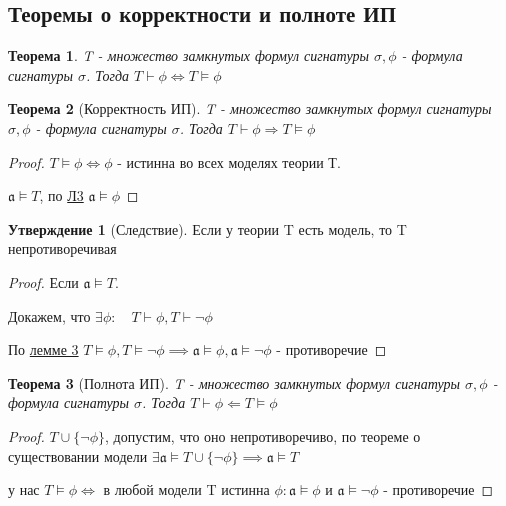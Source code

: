 \documentclass[a4paper]{article}
\newtheorem{theorem}{Теорема}[section]
\theoremstyle{definition}
\newtheorem*{statement}{Утверждение}
\theoremstyle{remark}
\begin{document}
    \subsection{Теоремы о корректности и полноте ИП}
	\begin{theorem}
        T - множество замкнутых формул сигнатуры $\sigma, \phi$ - формула сигнатуры $\sigma$. Тогда  
		$T \vdash \phi \Leftrightarrow T \models \phi$ 
	\end{theorem}
    \begin{theorem}[Корректность ИП]
        T - множество замкнутых формул сигнатуры $\sigma, \phi$ - формула сигнатуры $\sigma$. Тогда  
		$T \vdash \phi \Rightarrow T \models \phi$ 
	\end{theorem}
    \begin{proof}
        $T\models \phi \Leftrightarrow\phi$ - истинна во всех моделях теории Т.

        $\mathfrak{a}\models T$, по \hyperlink{Лемма 3}{Л3} $\mathfrak{a}\models \phi$
    \end{proof}
    \begin{statement}[Следствие]
        Если у теории T есть модель, то T непротиворечивая
    \end{statement}
    \begin{proof}
        Если $\mathfrak{a}\models T.$

        Докажем, что $\exists \phi: \quad T\vdash \phi, T\vdash \neg \phi$
        
        По \hyperlink{Лемма 3}{лемме 3}
        $T\models \phi, T\models \neg\phi\implies \mathfrak{a}\models \phi, \mathfrak{a}\models \neg\phi$ - противоречие
    \end{proof}
    \begin{theorem}[Полнота ИП]
        T - множество замкнутых формул сигнатуры $\sigma, \phi$ - формула сигнатуры $\sigma$. Тогда  
		$T \vdash \phi \Leftarrow T \models \phi$ 
	\end{theorem}
    \begin{proof}
        $T\cup \{\neg \phi\}$, допустим, что оно непротиворечиво, по теореме о существовании модели
        $\exists \mathfrak{a}\models T\cup \{\neg \phi\}\implies \mathfrak{a}\models T$

        у нас $T\models \phi \Leftrightarrow$ в любой модели T
        истинна $\phi: \mathfrak{a}\models \phi$ и $\mathfrak{a}\models \neg\phi$ - противоречие
    \end{proof}
\end{document}
